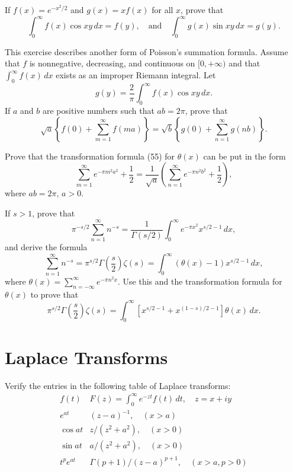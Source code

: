 \begin{problembox}
If $f(x) = e^{-x^2/2}$ and $g(x) = x f(x)$ for all $x$, prove that
\[
\int_0^\infty f(x) \cos xy \, dx = f(y), \quad \text{and} \quad \int_0^\infty g(x) \sin xy \, dx = g(y).
\]
\end{problembox}

\begin{problembox}
This exercise describes another form of Poisson's summation formula. Assume that $f$ is nonnegative, decreasing, and continuous on $[0, +\infty)$ and that $\int_0^\infty f(x) \, dx$ exists as an improper Riemann integral. Let
\[
g(y) = \frac{2}{\pi} \int_0^\infty f(x) \cos xy \, dx.
\]
If $a$ and $b$ are positive numbers such that $ab = 2\pi$, prove that
\[
\sqrt{a} \left\{ f(0) + \sum_{m=1}^\infty f(ma) \right\} = \sqrt{b} \left\{ g(0) + \sum_{n=1}^\infty g(nb) \right\}.
\]
\end{problembox}

\begin{problembox}
Prove that the transformation formula (55) for $\theta(x)$ can be put in the form
\[
\sum_{m=1}^\infty e^{-\pi m^2 a^2} + \frac{1}{2} = \frac{1}{\sqrt{a}} \left( \sum_{n=1}^\infty e^{-\pi n^2 b^2} + \frac{1}{2} \right),
\]
where $ab = 2\pi$, $a > 0$.
\end{problembox}

\begin{problembox}
If $s > 1$, prove that
\[
\pi^{-s/2} \sum_{n=1}^\infty n^{-s} = \frac{1}{\Gamma(s/2)} \int_0^\infty e^{-\pi x^2} x^{s/2-1} \, dx,
\]
and derive the formula
\[
\sum_{n=1}^\infty n^{-s} = \pi^{s/2} \Gamma\left(\frac{s}{2}\right) \zeta(s) = \int_0^\infty \left( \theta(x) - 1 \right) x^{s/2-1} \, dx,
\]
where $\theta(x) = \sum_{n=-\infty}^\infty e^{-\pi n^2 x}$. Use this and the transformation formula for $\theta(x)$ to prove that
\[
\pi^{s/2} \Gamma\left(\frac{s}{2}\right) \zeta(s) = \int_0^\infty \left[ x^{s/2-1} + x^{(1-s)/2-1} \right] \theta(x) \, dx.
\]
\end{problembox}

\section{Laplace Transforms}

\begin{problembox}
Verify the entries in the following table of Laplace transforms:
\[
\begin{array}{ll}
f(t) & F(z) = \int_0^\infty e^{-zt} f(t) \, dt, \quad z = x + iy \\
e^{at} & (z - a)^{-1}, \quad (x > a) \\
\cos at & z/(z^2 + a^2), \quad (x > 0) \\
\sin at & a/(z^2 + a^2), \quad (x > 0) \\
t^p e^{at} & \Gamma(p + 1)/(z - a)^{p+1}, \quad (x > a, p > 0)
\end{array}
\]
\end{problembox}

